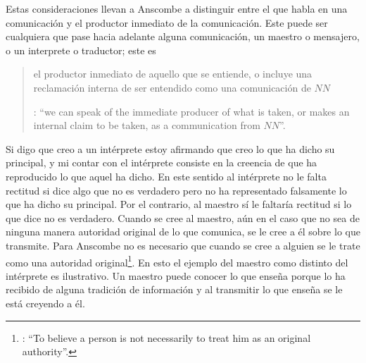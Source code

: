 Estas consideraciones llevan a Anscombe a distinguir entre el que habla en una comunicación y el productor inmediato de la comunicación. Este puede ser cualquiera que pase hacia adelante alguna comunicación, un maestro o mensajero, o un interprete o traductor; este es \blockquote[{\Cite[8]{anscombe2008faith:tobelieve}}: \enquote{we can speak of the immediate producer of what is taken, or makes an internal claim to be taken, as a communication from $NN$}.]{el productor inmediato de aquello que se entiende, o incluye una reclamación interna de ser entendido como una comunicación de $NN$}. Si digo que creo a un intérprete estoy afirmando que creo lo que ha dicho su principal, y mi contar con el intérprete consiste en la creencia de que ha reproducido lo que aquel ha dicho. En este sentido al intérprete no le falta rectitud si dice algo que no es verdadero pero no ha representado falsamente lo que ha dicho su principal. Por el contrario, al maestro sí le faltaría rectitud si lo que dice no es verdadero. Cuando se cree al maestro, aún en el caso que no sea de ninguna manera autoridad original de lo que comunica, se le cree a él sobre lo que transmite. Para Anscombe no es necesario que cuando se cree a alguien se le trate como una autoridad original\footnote{\cite[Cf.][5]{anscombe2008faith:tobelieve}: \enquote{To believe a person is not necessarily to treat him as an original authority}.}. En esto el ejemplo del maestro como distinto del intérprete es ilustrativo. Un maestro puede conocer lo que enseña porque lo ha recibido de alguna tradición de información y al transmitir lo que enseña se le está creyendo a él.

